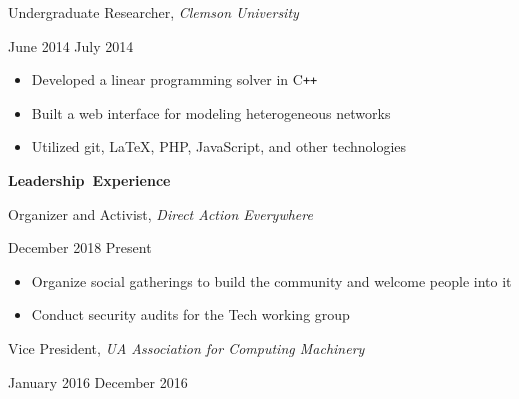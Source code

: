 \documentclass[11pt]{article}
\begin{document}
\begin{minipage}[t]{0.65\textwidth}
\flushleft
Undergraduate Researcher, \textit{Clemson University}\\
\end{minipage}
\begin{minipage}[t]{0.30\textwidth}
\flushright
June 2014 \space \textemdash \space July 2014\\
\end{minipage}

\begin{itemize}
  \item Developed a linear programming solver in C\texttt{++}
  \item Built a web interface for modeling heterogeneous networks
  \item Utilized git, \LaTeX, PHP, JavaScript, and other technologies
\end{itemize}

\vspace{0.8em}
\hbox{\large \textbf{Leadership Experience}}

\vspace{0.4em}
\begin{minipage}[t]{0.65\textwidth}
\flushleft
Organizer and Activist, \textit{Direct Action Everywhere}\\
\end{minipage}
\begin{minipage}[t]{0.30\textwidth}
\flushright
December 2018 \space \textemdash \space Present\\
\end{minipage}

\begin{itemize}
  \item Organize social gatherings to build the community and welcome people into it
  \item Conduct security audits for the Tech working group
\end{itemize}

\vspace{0.4em}
\begin{minipage}[t]{0.65\textwidth}
\flushleft
Vice President, \textit{UA Association for Computing Machinery}\\
\end{minipage}
\begin{minipage}[t]{0.30\textwidth}
\flushright
January 2016 \space \textemdash \space December 2016\\
\end{minipage}
\end{document}
